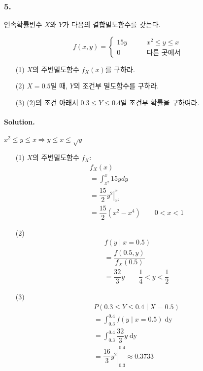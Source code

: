 \subsubsection{5.} 연속확률변수 $X$와 $Y$가 다음의 결합밀도함수를 갖는다. 

\[f\left(x, y\right) = \left\{
\begin{array}{ll}
	15y & \qquad x^2\leq y\leq x \\
	0 & \qquad\textrm{다른 곳에서}
\end{array}
\right. \]

\begin{itemize}
  \item [(1)] $X$의 주변밀도함수 $f_X\left(x\right)$를 구하라.
  \item [(2)] $X=0.5$일 때, $Y$의 조건부 밀도함수를 구하라.
  \item [(3)] (2)의 조건 아래서 $0.3\leq Y\leq 0.4$일 조건부 확률을 구하여라.
\end{itemize}

\paragraph{Solution.} $x^2\leq y\leq x \Rightarrow y\leq x \leq \sqrt{y}$
\begin{itemize}
  \item [(1)] $X$의 주변밀도함수 $f_X$:
\begin{align*}
	& f_X\left(x\right) \\
	&= \int_{x^2}^x 15y dy \\
	&= \dfrac{15}{2} \left.y^2\right|_{x^2}^x\\
	&= \dfrac{15}{2} \left(x^2-x^4\right) \qquad 0<x<1
\end{align*}
  \item [(2)]
\begin{align*}
	& f\left(y\middle|x=0.5\right) \\
	&= \dfrac{f\left(0.5, y\right)}{f_X\left(0.5\right)} \\
	&= \dfrac{32}{3}y \qquad \dfrac{1}{4}<y<\dfrac{1}{2}
\end{align*}
  \item [(3)]
 \begin{align*}
	& P\left(0.3\leq Y\leq 0.4\middle|X=0.5\right) \\
	&= \int_{0.3}^{0.4} f\left(y\middle|x=0.5\right) \mathop{dy} \\
	&= \int_{0.3}^{0.4} \dfrac{32}{3}y \mathop{dy} \\
	&= \left.\dfrac{16}{3}y^2\right|_{0.3}^{0.4} \approx 0.3733
\end{align*}
\end{itemize}


